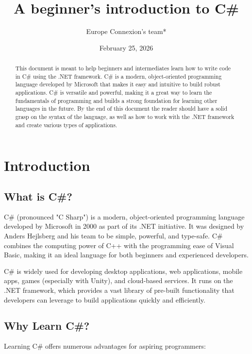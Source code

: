 \documentclass{article}
\title{A beginner's introduction to C\#}
\author{Europe Connexion's team*}
\date{February 25, 2026}
\begin{document}
\maketitle

\begin{abstract}
This document is meant to help beginners and intermediates learn how to write code in C\# using the .NET framework. C\# is a modern, object-oriented programming language developed by Microsoft that makes it easy and intuitive to build robust applications. C\# is versatile and powerful, making it a great way to learn the fundamentals of programming and builds a strong foundation for learning other languages in the future. By the end of this document the reader should have a solid grasp on the syntax of the language, as well as how to work with the .NET framework and create various types of applications.
\end{abstract}

\newpage

\tableofcontents

\newpage

\section{Introduction}

\subsection{What is C\#?}
C\# (pronounced "C Sharp") is a modern, object-oriented programming language developed by Microsoft in 2000 as part of its .NET initiative. It was designed by Anders Hejlsberg and his team to be simple, powerful, and type-safe. C\# combines the computing power of C++ with the programming ease of Visual Basic, making it an ideal language for both beginners and experienced developers.

C\# is widely used for developing desktop applications, web applications, mobile apps, games (especially with Unity), and cloud-based services. It runs on the .NET framework, which provides a vast library of pre-built functionality that developers can leverage to build applications quickly and efficiently.

\subsection{Why Learn C\#?}
Learning C\# offers numerous advantages for aspiring programmers:
\end{document}
